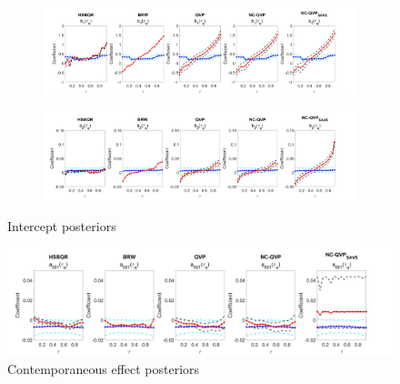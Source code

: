 \begin{figure}[H]
     \centering
     \begin{subfigure}[b]{\textwidth}
         \centering
         \includegraphics[width=\textwidth]{Figures/FigureCoeff1.jpg}
     \end{subfigure}
     \vfill
     \begin{subfigure}[b]{\textwidth}
         \centering
         \includegraphics[width=\textwidth]{Figures/FigureCoeff4.jpg}
     \end{subfigure}
        \caption{Intercept posteriors}
        \label{fig:CoeffsIntercept}
\end{figure}

\begin{figure}[H]
    \centering
    \includegraphics[width=\linewidth]{Figures/FigureCoeff7.jpg}
    \caption{Contemporaneous effect posteriors}
    \label{fig:CoeffsContemp}
\end{figure}

